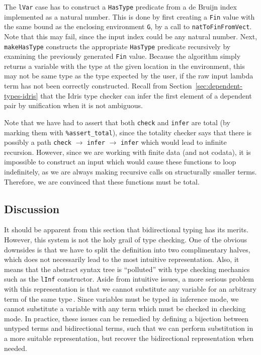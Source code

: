 The \texttt{lVar} case has to construct a \texttt{HasType} predicate from a de Bruijn index implemented as a natural number. This is done by first creating a \texttt{Fin} value with the same bound as the enclosing environment \texttt{G}, by a call to \texttt{natToFinFromVect}. Note that this may fail, since the input index could be any natural number. Next, \texttt{makeHasType} constructs the appropriate \texttt{HasType} predicate recursively by examining the previously generated \texttt{Fin} value. Because the algorithm simply returns a variable with the type at the given location in the environment, this may not be same type as the type expected by the user, if the raw input lambda term has not been correctly constructed. Recall from Section~\ref{sec:dependent-types-idris} that the Idris type checker can infer the first element of a dependent pair by unification when it is not ambiguous.

Note that we have had to assert that both \texttt{check} and \texttt{infer} are total (by marking them with \texttt{\%assert\_total}), since the totality checker says that there is possibly a path \texttt{check} $\longrightarrow$ \texttt{infer} $\longrightarrow$ \texttt{infer} which would lead to infinite recursion. However, since we are working with finite data (and not codata), it is impossible to construct an input which would cause these functions to loop indefinitely, as we are always making recursive calls on structurally smaller terms. Therefore, we are convinced that these functions must be total.

\subsection{Discussion}
It should be apparent from this section that bidirectional typing has its merits. However, this system is not the holy grail of type checking. One of the obvious downsides is that we have to split the definition into two complimentary halves, which does not necessarily lead to the most intuitive representation. Also, it means that the abstract syntax tree is ``polluted'' with type checking mechanics such as the \texttt{lInf} constructor. Aside from intuitive issues, a more serious problem with this representation is that we cannot substitute any variable for an arbitrary term of the same type\,\cite{Weirich:bidirectional}. Since variables must be typed in inference mode, we cannot substitute a variable with any term which must be checked in checking mode. In practice, these issues can be remedied by defining a bijection between untyped terms and bidirectional terms, such that we can perform substitution in a more suitable representation, but recover the bidirectional representation when needed.

